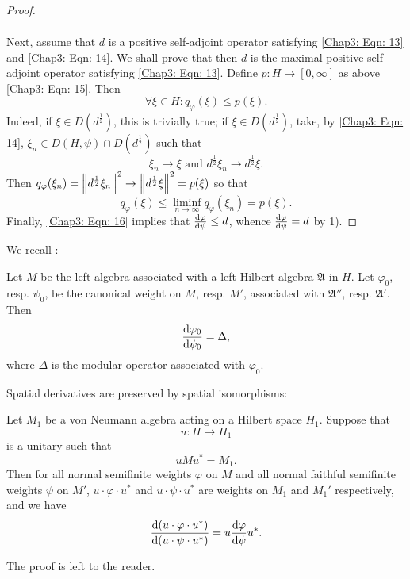 \begin{proof}
\[\begin{split}
        \end{split}
    \]\par
    Next, assume that $d$ is a positive self-adjoint operator satisfying \eqref{Chap3: Eqn: 13} and \eqref{Chap3: Eqn: 14}. We shall prove that then $d$ is the maximal positive self-adjoint operator satisfying \eqref{Chap3: Eqn: 13}. Define $p:H \to [0,\infty]$ as above \eqref{Chap3: Eqn: 15}. Then
    \begin{equation}\label{Chap3: Eqn: 16}
        \forall \xi\in H:q_\varphi(\xi)\leq p(\xi).
    \end{equation}
    Indeed, if $\xi\in D(d^\frac{1}{2})$, this is trivially true; if $\xi\in D(d^\frac{1}{2})$, take, by \eqref{Chap3: Eqn: 14}, $\xi_n\in D(H,\psi)\cap D(d^\frac{1}{2})$ such that
    \[
        \xi_n\to \xi\text{ and }d^\frac{1}{2}\xi_n\to d^\frac{1}{2}\xi.
    \]
    Then $q_\varphi(\xi_n)=\norm{d^\frac{1}{2}\xi_n}^2\to \norm{d^\frac{1}{2}\xi}^2=p(\xi)$ so that
    \[
        q_\varphi(\xi)\leq \liminf_{n\to \infty}q_\varphi(\xi_n)=p(\xi).
    \]
    Finally, \eqref{Chap3: Eqn: 16} implies that $\dv{\varphi}{\psi}\leq d$, whence $\dv{\varphi}{\psi}=d$ by 1).
\end{proof}
We recall \cite[proof of Theorem 9]{1}:
\begin{example}\label{Chap3: Eg: 23}
    Let $M$ be the left algebra associated with a left Hilbert algebra $\mathfrak{A}$ in $H$. Let $\varphi_0$, resp. $\psi_0$, be the canonical weight on $M$, resp. $M'$, associated with $\mathfrak{A}''$, resp. $\mathfrak{A}'$. Then
    \[
        \dv{\varphi_0}{\psi_0}=\Delta,
    \]
    where $\Delta$ is the modular operator associated with $\varphi_0$.
\end{example}
Spatial derivatives are preserved by spatial isomorphisms:
\begin{proposition}\label{Chap3: Prop: 24}
    Let $M_1$ be a von Neumann algebra acting on a Hilbert space $H_1$. Suppose that
    \[
        u:H\to H_1
    \]
    is a unitary such that
    \[
        uMu^*=M_1.
    \]
    Then for all normal semifinite weights $\varphi$ on $M$ and all normal faithful semifinite weights $\psi$ on $M'$, $u\cdot\varphi\cdot u^*$ and $u\cdot\psi\cdot u^*$ are weights on $M_1$ and $M_1'$ respectively, and we have
    \[
        \dv{(u\cdot\varphi\cdot u^*)}{(u\cdot\psi\cdot u^*)}=u\dv{\varphi}{\psi}u^*.
    \]
\end{proposition}
The proof is left to the reader.
